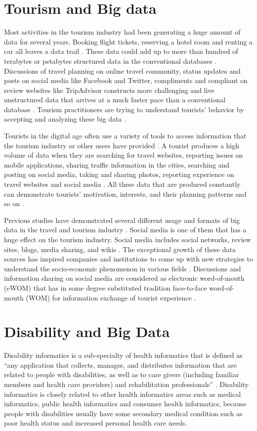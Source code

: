 \section{Tourism and Big data}
Most activities in the tourism industry had been generating a huge amount of data for
several years. Booking flight tickets, reserving a hotel room and renting a car all
leaves a data trail \cite{Shafiee16}. These data could add up to more than hundred of
terabytes or petabytes structured data in the conventional databases \cite{akerkar2012}.
Discussions of travel planning on online travel community, status updates and posts on
social media like Facebook and Twitter, compliments and compliant on review websites like TripAdvisor
constructs more challenging and live unstructured data that arrives at a much
faster pace than a conventional database \cite{akerkar2012}. Tourism practitioners are
trying to understand tourists' behavior by accepting and analyzing these big data 
\cite{Shafiee16}.

Tourists in the digital age often use a variety of tools to access information that
the tourism industry or other users have provided \cite{XIANG2015120}. A tourist
produces a high volume of data when they are searching for travel websites, reporting
issues on mobile applications, sharing traffic information in the cities, searching and
posting on social media, taking and sharing photos, reporting experience on travel
websites and social media \cite{akerkar2012, Shafiee16}. All these data that are
produced constantly can demonstrate tourists' motivation, interests, and their
planning patterns and so on \cite{XIE2017101}.

Previous studies have demonstrated several different usage and formats of big data in
the travel and tourism industry \cite{XIE2017101}. Social media is one of them that
has a huge effect on the tourism industry. Social media includes social networks,
review sites, blogs, media sharing, and wikis \cite{XIANG2015120}. The exceptional
growth of these data sources has inspired companies and institutions to come up with 
new strategies to understand the socio-economic phenomenon in various
fields \cite{Shafiee16}. Discussions and information sharing on social media are
considered as electronic word-of-mouth (eWOM) that has in some degree substituted
tradition face-to-face word-of-mouth (WOM) for information exchange of tourist
experience \cite{chung2009}. 

\section{Disability and Big Data}
Disability informatics is a sub-specialty of health informatics that is defined as ``any application that
collects, manages, and distributes information that are related to people with disabilities, as well as to
care givers (including familiar members and health care providers) and rehabilitation professionals''
\cite{Appleyard2005}. Disability informatics is closely related to other health informatics areas such as
medical informatics, public health informatics and consumer health informatics, because people with
disabilities usually have some secondary medical condition such as poor health status and increased
personal health care needs. 

